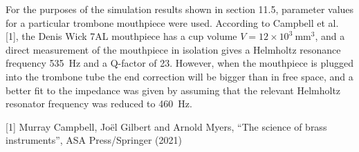   For the purposes of the simulation results shown in section 11.5, parameter 
  values for a particular trombone mouthpiece were used. According to Campbell 
  et al. [1], the Denis Wick 7AL mouthpiece has a cup volume $V=12 \times 
  10^3\mathrm{~mm^3}$, and a direct measurement of the mouthpiece in isolation 
  gives a Helmholtz resonance frequency 535~Hz and a Q-factor of 23. However, 
  when the mouthpiece is plugged into the trombone tube the end correction will 
  be bigger than in free space, and a better fit to the impedance was given by 
  assuming that the relevant Helmholtz resonator frequency was reduced to 
  460~Hz. 

  \sectionreferences{}[1] Murray Campbell, Joël Gilbert and Arnold Myers, “The 
  science of brass instruments”, ASA Press/Springer (2021) 